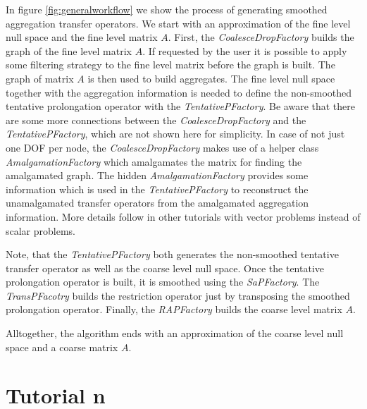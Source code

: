 In figure \ref{fig:generalworkflow} we show the process of generating smoothed aggregation transfer operators. We start with an approximation of the fine level null space and the fine level matrix $A$.
First, the \textit{CoalesceDropFactory} builds the graph of the fine level matrix $A$. If requested by the user it is possible to apply some filtering strategy to the fine level matrix before the graph is built. The graph of matrix $A$ is then used to build aggregates. The fine level null space together with the aggregation information is needed to define the non-smoothed tentative prolongation operator with the \textit{TentativePFactory}. Be aware that there are some more connections between the \textit{CoalesceDropFactory} and the \textit{TentativePFactory}, which are not shown here for simplicity. In case of not just one DOF per node, the \textit{CoalesceDropFactory} makes use of a helper class \textit{AmalgamationFactory} which amalgamates the matrix for finding the amalgamated graph. The hidden \textit{AmalgamationFactory} provides some information which is used in the \textit{TentativePFactory} to reconstruct the unamalgamated transfer operators from the amalgamated aggregation information. More details follow in other tutorials with vector problems instead of scalar problems.

Note, that the \textit{TentativePFactory} both generates the non-smoothed tentative transfer operator as well as the coarse level null space. Once the tentative prolongation operator is built, it is smoothed using the \textit{SaPFactory}. The \textit{TransPFacotry} builds the restriction operator just by transposing the smoothed prolongation operator. Finally, the \textit{RAPFactory} builds the coarse level matrix $A$.

Alltogether, the algorithm ends with an approximation of the coarse level null space and a coarse matrix $A$.


\section{Tutorial n}


